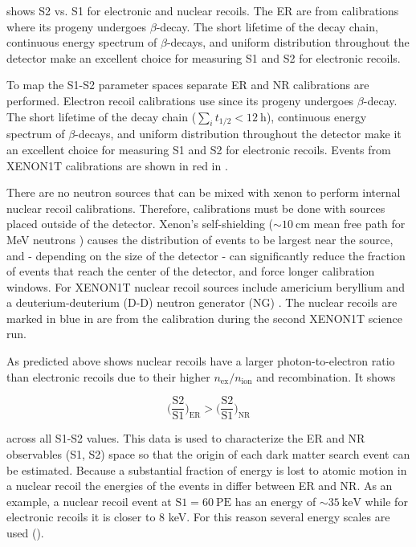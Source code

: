  shows S2 vs. S1 for electronic and nuclear recoils.  The ER are from  calibrations
where its progeny  undergoes $\beta$-decay.  The short lifetime of the  decay chain, continuous energy spectrum
of $\beta$-decays, and uniform distribution throughout the detector make  an excellent choice for measuring S1 and S2 for
electronic recoils.

To map the S1-S2 parameter spaces separate ER and NR calibrations are performed.  Electron recoil calibrations use  since
its progeny  undergoes $\beta$-decay.  The short lifetime of the  decay chain
($\sum_i t_{1/2} < 12\ \mathrm{h}$), continuous energy spectrum
of $\beta$-decays, and uniform distribution throughout the detector make it an excellent choice for measuring S1 and S2 for
electronic recoils.  Events from XENON1T calibrations are shown in red in .

There are no neutron sources that can be mixed with xenon to perform internal nuclear recoil calibrations.  Therefore, calibrations
must be done with sources placed outside of the detector.  Xenon's self-shielding (${\sim}10\ \mathrm{cm}$ mean free path for MeV
neutrons ) causes the distribution of events to be largest near
the source, and - depending on the size of the detector - can significantly reduce the fraction of events that reach the center of the
detector, and force longer calibration windows.  For XENON1T nuclear recoil sources include
americium beryllium  and a deuterium-deuterium (D-D) neutron generator (NG) .  The nuclear recoils are
marked in blue in  are from the \ambe calibration during the second XENON1T science run.

As predicted above  shows nuclear recoils have a larger photon-to-electron ratio than electronic recoils due
to their higher $n_{\mathrm{ex}}/n_{\mathrm{ion}}$ and recombination.  It shows

\begin{equation}
\bigg( \frac{\mathrm{S}2}{\mathrm{S}1} \bigg)_{\mathrm{ER}} > \bigg( \frac{\mathrm{S}2}{\mathrm{S}1} \bigg)_{\mathrm{NR}}
\end{equation}

\noindent across all S1-S2 values.  This data is used to characterize the ER and NR observables (S1, S2) space so that the origin of each
dark
matter search event can be estimated.  Because a substantial fraction of energy is lost to atomic motion in a nuclear recoil the energies
of the events in  differ between ER and NR.  As an example, a nuclear recoil event at
$\mathrm{S1} = 60\ \mathrm{PE}$ has an energy of ${\sim}35\ \mathrm{keV}$ while for electronic recoils it is closer to 8 keV.  For this
reason several energy scales are used ().

